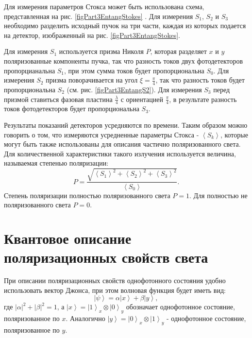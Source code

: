

Для измерения параметров Стокса может быть использована схема,
представленная на рис. \ref{figPart3EntangStokes}
\cite{bEntangKlyshko}. Для измерения $S_1$, $S_2$ и $S_3$ необходимо
разделить исходный пучок на три части, каждая из которых подается на
детектор, изображенный на рис. \ref{figPart3EntangStokes}.



Для измерения $S_1$ используется призма Николя $P$, которая разделяет 
$x$ и $y$ поляризованные компоненты пучка,
так что разность токов двух фотодетекторов пропорцианальна $S_1$, при
этом сумма токов будет пропорциональна $S_0$. 
Для измерения $S_2$ призма поворачивается на угол $\xi =
\frac{\pi}{4}$, так что разность токов будет пропорциональна $S_2$
(см. рис. \ref{figPart3EntangS2}). 
Для измерения $S_3$ перед призмой ставиться фазовая пластина
$\frac{\lambda}{4}$ с ориентацией $\frac{\pi}{4}$, в результате
разность токов фотодетекторов будет пропорциональна $S_3$.

Результаты показаний детекторов усредняются по времени. Таким образом можно
говорить о том, что измеряются усредненные параметры Стокса - 
$\left<S_k\right>$, которые могут быть также использованы для описания
частично поляризованного света. Для количественной характеристики
такого излучения используется величина, называемая
степенью поляризации:
\begin{equation}
P = \frac{\sqrt{\left<S_1\right>^2 + \left<S_2\right>^2 +
    \left<S_3\right>^2}}{\left<S_0\right>}.
\label{eqEntangPolyarDegree}
\nonumber
\end{equation}
Степень поляризации полностью поляризованного света $P = 1$. Для  полностью не
поляризованного света $P = 0$.

\section{Квантовое описание поляризационных свойств света}
При описании поляризационных свойств однофотонного состояния удобно
использовать вектор Джонса, при этом волновая функция будет иметь вид:
\begin{equation}
\left|\psi\right> = 
\alpha \left|x\right> + 
\beta \left|y\right>,
\label{eqEntangSimpleState}
\end{equation}
где $\left|\alpha\right|^2 + \left|\beta\right|^2 = 1$, а
$\left|x\right> = \left|1\right>_x\otimes\left|0\right>_y$ обозначает
однофотонное состояние, поляризованное по $x$. Аналогично 
$\left|y\right> = \left|0\right>_x\otimes\left|1\right>_y$ -
однофотонное состояние, поляризованное по $y$. 

